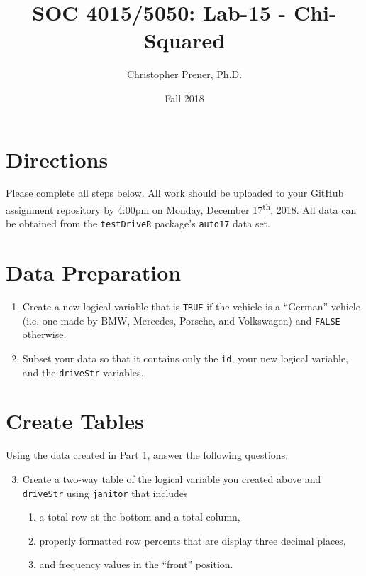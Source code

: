 \documentclass{tufte-handout}
\title{SOC 4015/5050: Lab-15 - Chi-Squared}
\author{Christopher Prener, Ph.D.}
\date{Fall 2018}
\begin{document}

\maketitle %


\vspace{5mm}
\section{Directions}
Please complete all steps below. All work should be uploaded to your GitHub assignment repository by 4:00pm on Monday, December 17\textsuperscript{th}, 2018. All data can be obtained from the \texttt{testDriveR} package's \texttt{auto17} data set.

\vspace{3mm}
\section{Data Preparation}
\begin{enumerate}
\item Create a new logical variable that is \texttt{TRUE} if the vehicle is a ``German'' vehicle (i.e. one made by BMW, Mercedes, Porsche, and Volkswagen) and \texttt{FALSE} otherwise.
\item Subset your data so that it contains only the \texttt{id}, your new logical variable, and the \texttt{driveStr} variables.
\end{enumerate}

\vspace{3mm}
\section{Create Tables}
Using the data created in Part 1, answer the following questions. 
\begin{enumerate}
\setcounter{enumi}{2}
\item Create a two-way table of the logical variable you created above and \texttt{driveStr} using \texttt{janitor} that includes 
\begin{enumerate}
\item a total row at the bottom and a total column,
\item properly formatted row percents that are display three decimal places,
\item and frequency values in the ``front'' position.
\end{enumerate}
\end{enumerate}
\end{document}

